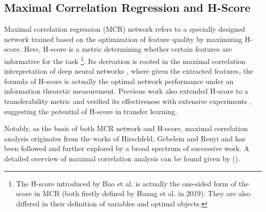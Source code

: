 \documentclass[letterpaper]{article} %
\begin{document}
\subsection{Maximal Correlation Regression and H-Score}\label{sec:H-score}

 Maximal correlation regression (MCR) network \citep{xu2020maximal} refers to a specially designed network trained based on the optimization of feature quality by maximizing H-score. Here, H-score is a metric determining whether certain features are informative for the task  \citep[more formally introduced by][]{bao2019information}\footnote{The H-score introduced by Bao et al. is actually the one-sided form of the score in MCR (both firstly defined by Huang et al. in 2019). They are also differed in their definition of variables and optimal objects.}. Its derivation is rooted in the maximal correlation interpretation of deep neural networks \citep{huang2019universal}, where given the extracted features, the formula of H-score is actually the optimal network performance under an information theoretic measurement. Previous work also extended H-score to a transferability metric and verified its effectiveness with extensive experiments \citep{bao2019information, ibrahim2022newer}, suggesting the potential of H-score in transfer learning.

Notably, as the basis of both MCR network and H-score, maximal correlation analysis originates from the works of Hirschfeld, Gebelein and Renyi \citep{hirschfeld1935connection, gebelein1941statistische, renyi1959measures} and has been followed and further explored by a broad spectrum of successive work. A detailed overview of maximal correlation analysis can be found given by \citeauthor{huang2019universal} (\citeyear{huang2019universal}).

\end{document}
